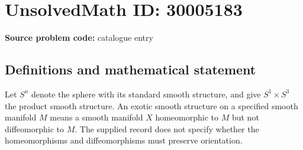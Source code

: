 \documentclass[11pt]{article}
\begin{document}
\section*{UnsolvedMath ID: 30005183}
\textbf{Source problem code:} catalogue entry
\subsection{Definitions and mathematical statement}
Let \(S^n\) denote the sphere with its standard smooth structure, and give \(S^1\times S^3\) the product smooth structure. An exotic smooth structure on a specified smooth manifold \(M\) means a smooth manifold \(X\) homeomorphic to \(M\) but not diffeomorphic to \(M\). The supplied record does not specify whether the homeomorphisms and diffeomorphisms must preserve orientation.
\end{document}
